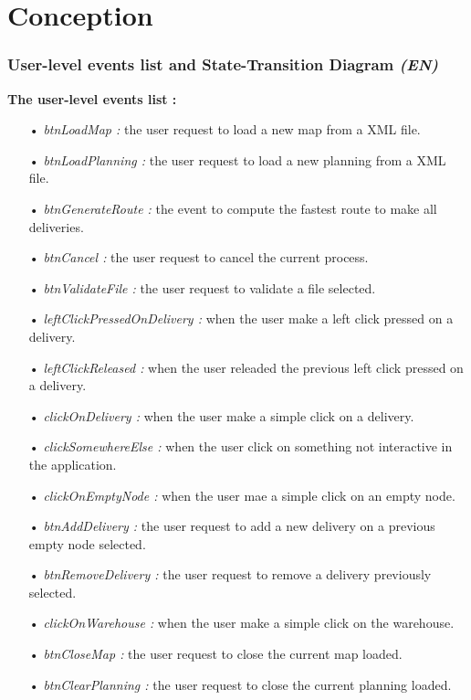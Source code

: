 \documentclass[paper=a4, fontsize=11pt]{report}
\numberwithin{equation}{section}		%
\numberwithin{figure}{section}		%
\numberwithin{table}{section}		%
\renewcommand{\bf}[1]{\textbf{#1}}
\renewcommand{\it}[1]{\textit{#1}}
\newcommand{\Todo}[1]{\todo[inline]{#1}}
\begin{document}
\part{Conception}
\label{part:conception}
\setcounter{section}{0}

\section{User-level events list and State-Transition Diagram \it{(EN)}}
\label{sec:user-level-events-list-and-state-transition-diagram}

\Todo{We should add a comment here}

\bf{The user-level events list :}
\begin{itemize}
  \item[•] \it{btnLoadMap :} the user request to load a new map from a XML file.
  \item[•] \it{btnLoadPlanning :} the user request to load a new planning from a XML file.
  \item[•] \it{btnGenerateRoute :} the event to compute the fastest route to make all deliveries.
  \item[•] \it{btnCancel :} the user request to cancel the current process.
  \item[•] \it{btnValidateFile :} the user request to validate a file selected.
  \item[•] \it{leftClickPressedOnDelivery :} when the user make a left click pressed on a delivery.
  \item[•] \it{leftClickReleased :} when the user releaded the previous left click pressed on a delivery.
  \item[•] \it{clickOnDelivery :} when the user make a simple click on a delivery.
  \item[•] \it{clickSomewhereElse :} when the user click on something not interactive in the application.
  \item[•] \it{clickOnEmptyNode :} when the user mae a simple click on an empty node.
  \item[•] \it{btnAddDelivery :} the user request to add a new delivery on a previous empty node selected.
  \item[•] \it{btnRemoveDelivery :} the user request to remove a delivery previously selected.
  \item[•] \it{clickOnWarehouse :} when the user make a simple click on the warehouse.
  \item[•] \it{btnCloseMap :} the user request to close the current map loaded.
  \item[•] \it{btnClearPlanning :} the user request to close the current planning loaded.
\end{itemize}
\end{document}
